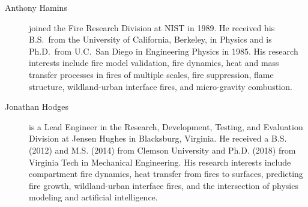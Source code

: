\begin{description}
\item[Anthony Hamins] joined the Fire Research Division at NIST in 1989. He received his B.S.~from the University of California, Berkeley, in Physics and is Ph.D.~from U.C.~San Diego in Engineering Physics in 1985.  His research interests include fire model validation, fire dynamics, heat and mass transfer processes in fires of multiple scales, fire suppression, flame structure, wildland-urban interface fires, and micro-gravity combustion.

\item[Jonathan Hodges] is a Lead Engineer in the Research, Development, Testing, and Evaluation Division at Jensen Hughes in Blacksburg, Virginia. He received a B.S. (2012) and M.S. (2014) from Clemson University and Ph.D. (2018) from Virginia Tech in Mechanical Engineering. His research interests include compartment fire dynamics, heat transfer from fires to surfaces, predicting fire growth, wildland-urban interface fires, and the intersection of physics modeling and artificial intelligence.





\end{description}
